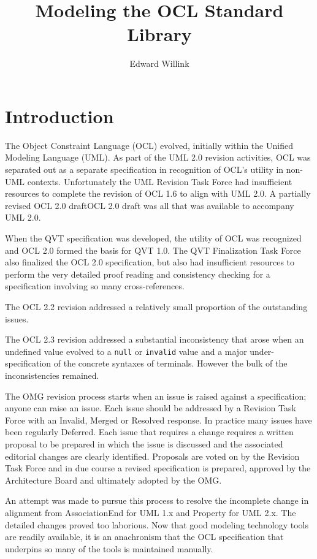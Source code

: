 \documentclass{eceasst}
\title{%
Modeling the OCL Standard Library}
\author{%
Edward Willink\autref{1}}
\institute{%
\autlabel{1} \email{ed \_at\_ willink.me.uk}, \url{http://www.eclipse.org/modeling}\\
Eclipse Modeling Project}
\begin{document}
\maketitle
\section{Introduction}

The Object Constraint Language (OCL) evolved, initially within the Unified Modeling Language (UML). As part of the UML 2.0\cite{UML-2.0} revision activities, OCL was separated out as a separate specification in recognition of OCL's utility in non-UML contexts. Unfortunately the UML Revision Task Force had insufficient resources to complete the revision of OCL 1.6\cite{OCL-1.6} to align with UML 2.0. A partially revised OCL 2.0 draft{OCL 2.0 draft} was all that was available to accompany UML 2.0.

When the QVT specification was developed, the utility of OCL was recognized and OCL 2.0\cite{OCL-2.0} formed the basis for QVT 1.0\cite{QVT-1.0}. The QVT Finalization Task Force also finalized the OCL 2.0 specification, but also had insufficient resources to perform the very detailed proof reading and consistency checking for a specification involving so many cross-references.

The OCL 2.2\cite{OCL-2.2} revision addressed a relatively small proportion of the outstanding issues.

The OCL 2.3\cite{OCL-2.3} revision addressed a substantial inconsistency that arose when an undefined value evolved to a \verb|null| or \verb|invalid| value and a major under-specification of the concrete syntaxes of terminals. However the bulk of the inconsistencies remained.

The OMG revision process starts when an issue is raised against a specification; anyone can raise an issue. Each issue should be addressed by a Revision Task Force with an Invalid, Merged or Resolved response. In practice many issues have been regularly Deferred. Each issue that requires a change requires a written proposal to be prepared in which the issue is discussed and the associated editorial changes are clearly identified. Proposals are voted on by the Revision Task Force and in due course a revised specification is prepared, approved by the Architecture Board and ultimately adopted by the OMG.

An attempt was made to pursue this process to resolve the incomplete change in alignment from AssociationEnd for UML 1.x and Property for UML 2.x. The detailed changes proved too laborious. Now that good modeling technology tools are readily available, it is an anachronism that the OCL specification that underpins so many of the tools is maintained manually.
\end{document}

